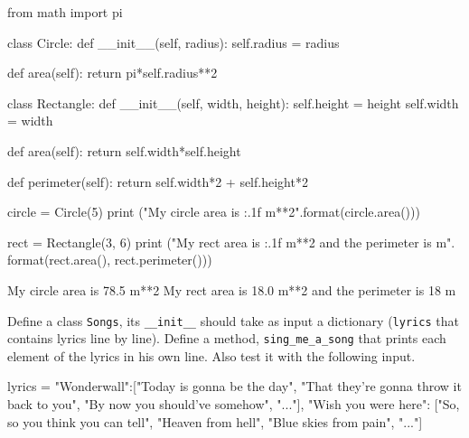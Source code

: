 \cprotEnv\begin{solution}
\begin{ipython}
from math import pi

class Circle:
    def __init__(self, radius):
        self.radius = radius

    def area(self):
        return pi*self.radius**2

class Rectangle:
    def __init__(self, width, height):
        self.height = height
        self.width = width

    def area(self):
        return self.width*self.height

    def perimeter(self):
        return self.width*2 + self.height*2

circle = Circle(5)
print ("My circle area is {:.1f} m**2".format(circle.area()))

rect = Rectangle(3, 6)
print ("My rect area is {:.1f} m**2 and the perimeter is {} m". \\
        format(rect.area(), rect.perimeter()))
\end{ipython}
\begin{ioutput}
My circle area is 78.5 m**2
My rect area is 18.0 m**2 and the perimeter is 18 m
\end{ioutput}
\end{solution}

\cprotEnv\begin{question}
Define a class \texttt{Songs}, its \texttt{\_\_init\_\_} should take as input a dictionary (\texttt{lyrics} that contains lyrics line by line). Define a method, \texttt{sing\_me\_a\_song} that prints each element of the lyrics in his own line. Also test it with the following input.

\begin{ipython}
lyrics = {"Wonderwall":["Today is gonna be the day",
	                    "That they're gonna throw it back to you",
	                    "By now you should've somehow", "..."],
	      "Wish you were here": ["So, so you think you can tell",
                                 "Heaven from hell",
	                             "Blue skies from pain", "..."]}
\end{ipython}
\end{question}

